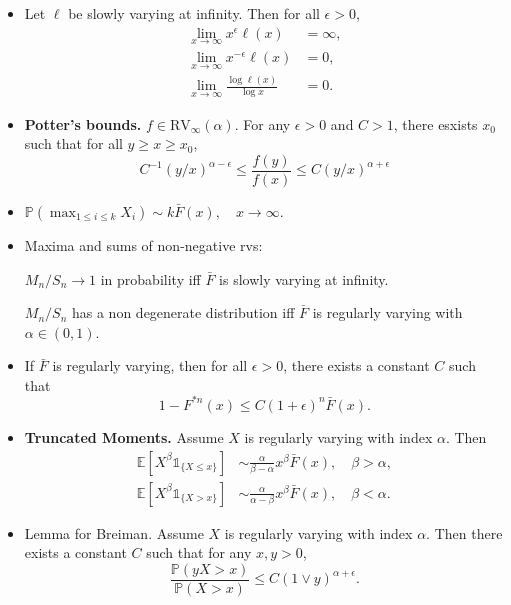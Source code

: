 \documentclass[11pt,reqno]{amsart}
\newcommand{\E}{\mathbb{E}}
\renewcommand{\P}{\mathbb{P}}
\newcommand{\1}{\mathds{1}}
\newcommand{\Fo}{\bar{F}}
\newcommand{\0}{\boldsymbol{0}}
\newcommand{\4}{\mathchoice{\mskip1.5mu}{\mskip1.5mu}{}{}}
\newcommand{\5}{\mathchoice{\mskip-1.5mu}{\mskip-1.5mu}{}{}}
\newcommand{\2}{\penalty250\mskip\thickmuskip\mskip-\thinmuskip} %
\begin{document}
\begin{itemize}
\item Let $\ell$ be slowly varying at infinity. Then for all $\epsilon>0$,
\begin{equation*}
\begin{split}
\lim_{x\to \infty} x^{\epsilon}\ell(x)&= \infty,\\
\lim_{x\to \infty} x^{-\epsilon}\ell(x)&= 0,\\
\lim_{x\to \infty} \frac{\log\ell(x)}{\log x}&= 0.
\end{split}
\end{equation*}


\item {\bf Potter's bounds.} $f\in \text{RV}_\infty (\alpha)$. For any $\epsilon>0$ and $C>1$, there esxists $x_0$ such that for all $y\geq x\geq x_0$,
\begin{equation*}
C^{-1} (y/x)^{\alpha-\epsilon}\leq \frac{f(y)}{f(x)} \leq C (y/x)^{\alpha+\epsilon}
\end{equation*}

\item $\P(\max_{1\leq i \leq k} X_i)\sim k\Fo(x), \quad x\to \infty$.
\item Maxima and sums of non-negative rvs:

$M_n/S_n \to 1$ in probability iff $\Fo$ is slowly varying at infinity.

$M_n/S_n$ has a non degenerate distribution iff $\Fo$ is regularly varying with $\alpha \in (0,1)$.

\item If $\Fo$ is regularly varying, then for all $\epsilon>0$, there
exists a constant $C$ such that 
\begin{equation*}
1-F^{*n}(x) \leq C(1+\epsilon)^n \Fo (x).
\end{equation*}

\item {\bf Truncated Moments.} Assume $X$ is regularly varying with index $\alpha$. Then
\begin{equation*}
\begin{split}
\E[X^\beta \1_{\{X\leq x\}}] &\sim \frac{\alpha}{\beta -\alpha} x^\beta \Fo(x), \quad \beta>\alpha,\\
\E[X^\beta \1_{\{X > x\}}] &\sim \frac{\alpha}{\alpha-\beta} x^\beta \Fo(x), \quad \beta<\alpha.
\end{split}
\end{equation*}

\item Lemma for Breiman. Assume $X$ is regularly varying with index $\alpha$. Then
there exists a constant $C$ such that for any $x,y>0$,
\begin{equation*}
\frac{\P(yX>x)}{\P(X>x)}\leq C (1 \vee y)^{\alpha +\epsilon}.
\end{equation*}


\end{itemize}
\end{document}
